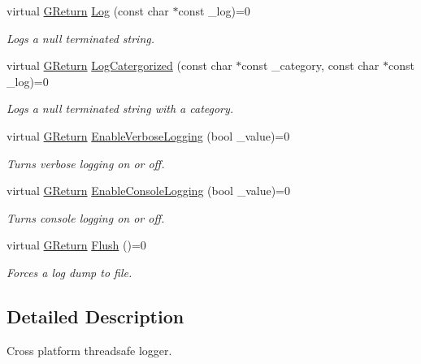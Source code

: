 \begin{DoxyCompactItemize}
\item 
virtual \hyperlink{namespaceGW_a67a839e3df7ea8a5c5686613a7a3de21}{G\+Return} \hyperlink{classGW_1_1SYSTEM_1_1GLog_a9e21e702d012065fe799b4c49f7ac670}{Log} (const char $\ast$const \+\_\+log)=0
\begin{DoxyCompactList}\small\item\em Logs a null terminated string. \end{DoxyCompactList}\item 
virtual \hyperlink{namespaceGW_a67a839e3df7ea8a5c5686613a7a3de21}{G\+Return} \hyperlink{classGW_1_1SYSTEM_1_1GLog_a5d10397fa6aeeebaf8430df6029ec3c5}{Log\+Catergorized} (const char $\ast$const \+\_\+category, const char $\ast$const \+\_\+log)=0
\begin{DoxyCompactList}\small\item\em Logs a null terminated string with a category. \end{DoxyCompactList}\item 
virtual \hyperlink{namespaceGW_a67a839e3df7ea8a5c5686613a7a3de21}{G\+Return} \hyperlink{classGW_1_1SYSTEM_1_1GLog_adea469091bba33b419f7e88a9c2c3049}{Enable\+Verbose\+Logging} (bool \+\_\+value)=0
\begin{DoxyCompactList}\small\item\em Turns verbose logging on or off. \end{DoxyCompactList}\item 
virtual \hyperlink{namespaceGW_a67a839e3df7ea8a5c5686613a7a3de21}{G\+Return} \hyperlink{classGW_1_1SYSTEM_1_1GLog_a1eb651aa3d5b6b8baac389be284a569d}{Enable\+Console\+Logging} (bool \+\_\+value)=0
\begin{DoxyCompactList}\small\item\em Turns console logging on or off. \end{DoxyCompactList}\item 
virtual \hyperlink{namespaceGW_a67a839e3df7ea8a5c5686613a7a3de21}{G\+Return} \hyperlink{classGW_1_1SYSTEM_1_1GLog_a07147c15ecb17caa1c83974b3c54f7d4}{Flush} ()=0
\begin{DoxyCompactList}\small\item\em Forces a log dump to file. \end{DoxyCompactList}\end{DoxyCompactItemize}


\subsection{Detailed Description}
Cross platform threadsafe logger. 

